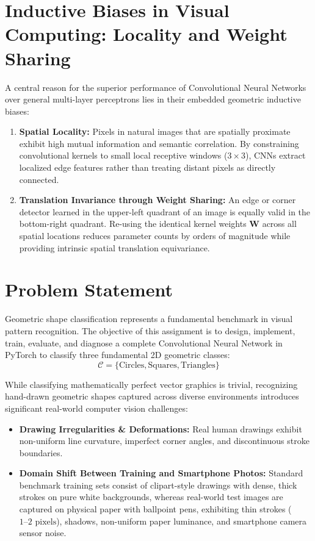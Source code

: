 \documentclass[11pt,a4paper,oneside]{report}
\begin{document}
\section{Inductive Biases in Visual Computing: Locality and Weight Sharing}
A central reason for the superior performance of Convolutional Neural Networks over general multi-layer perceptrons lies in their embedded geometric inductive biases:
\begin{enumerate}[leftmargin=*]
    \item \textbf{Spatial Locality:} Pixels in natural images that are spatially proximate exhibit high mutual information and semantic correlation. By constraining convolutional kernels to small local receptive windows ($3\times 3$), CNNs extract localized edge features rather than treating distant pixels as directly connected.
    \item \textbf{Translation Invariance through Weight Sharing:} An edge or corner detector learned in the upper-left quadrant of an image is equally valid in the bottom-right quadrant. Re-using the identical kernel weights $\mathbf{W}$ across all spatial locations reduces parameter counts by orders of magnitude while providing intrinsic spatial translation equivariance.
\end{enumerate}

\section{Problem Statement}
Geometric shape classification represents a fundamental benchmark in visual pattern recognition. The objective of this assignment is to design, implement, train, evaluate, and diagnose a complete Convolutional Neural Network in PyTorch to classify three fundamental 2D geometric classes:
\begin{equation}
    \mathcal{C} = \{\text{Circles}, \text{Squares}, \text{Triangles}\}
\end{equation}

While classifying mathematically perfect vector graphics is trivial, recognizing hand-drawn geometric shapes captured across diverse environments introduces significant real-world computer vision challenges:
\begin{itemize}[leftmargin=*]
    \item \textbf{Drawing Irregularities \& Deformations:} Real human drawings exhibit non-uniform line curvature, imperfect corner angles, and discontinuous stroke boundaries.
    \item \textbf{Domain Shift Between Training and Smartphone Photos:} Standard benchmark training sets consist of clipart-style drawings with dense, thick strokes on pure white backgrounds, whereas real-world test images are captured on physical paper with ballpoint pens, exhibiting thin strokes ($1\text{--}2\text{ pixels}$), shadows, non-uniform paper luminance, and smartphone camera sensor noise.
\end{itemize}
\end{document}

